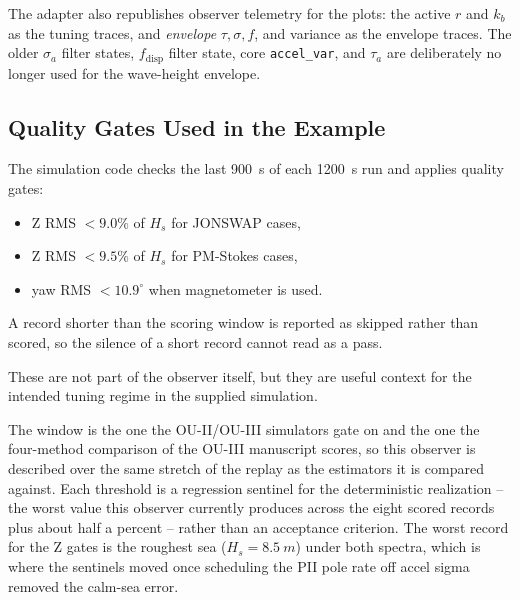 \documentclass[conference]{IEEEtran}
\begin{document}
    The adapter also republishes observer telemetry for the plots: the active
    \(r\) and \(k_b\) as the tuning traces, and \emph{envelope}
    \(\tau,\sigma,f\), and variance as the envelope traces. The older
    \(\sigma_{a}\) filter states, \(f_{\mathrm{disp}}\) filter state, core
    \texttt{accel\_var}, and \(\tau_a\) are deliberately no longer used for the
    wave-height envelope.

    \subsection{Quality Gates Used in the Example}

    The simulation code checks the last \SI{900}{s} of each \SI{1200}{s} run and
    applies quality gates:
    \begin{itemize}[leftmargin=1.4em]
        \item Z RMS \(< 9.0\%\) of \(H_s\) for JONSWAP cases,
        \item Z RMS \(< 9.5\%\) of \(H_s\) for PM-Stokes cases,
        \item yaw RMS \(< 10.9^\circ\) when magnetometer is used.
    \end{itemize}
    A record shorter than the scoring window is reported as skipped rather than
    scored, so the silence of a short record cannot read as a pass.

    These are not part of the observer itself, but they are useful context for the
    intended tuning regime in the supplied simulation.

    The window is the one the OU-II/OU-III simulators gate on and the one the
    four-method comparison of the OU-III manuscript scores, so this observer is
    described over the same stretch of the replay as the estimators it is
    compared against. Each threshold is a regression sentinel for the
    deterministic realization -- the worst value this observer currently produces
    across the eight scored records plus about half a percent -- rather than an
    acceptance criterion. The worst record for the Z gates is the roughest sea
    (\(H_s=\SI{8.5}{m}\)) under both spectra, which is where the sentinels moved
    once scheduling the PII pole rate off accel sigma removed the calm-sea error.
\end{document}
